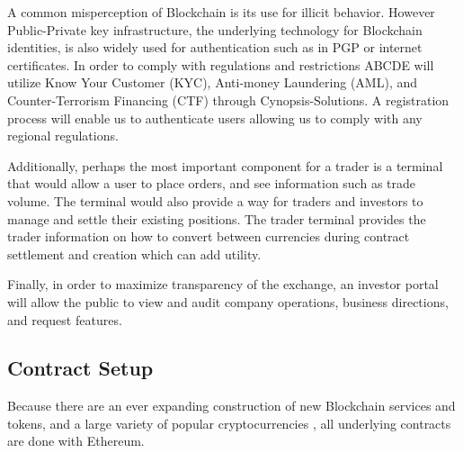 A common misperception of Blockchain is its use for illicit behavior. 
However Public-Private key infrastructure, the underlying technology for Blockchain identities, is also widely used for authentication such as in PGP or internet certificates.
In order to comply with regulations and restrictions ABCDE will utilize Know Your Customer (KYC), Anti-money Laundering (AML), and Counter-Terrorism Financing (CTF) through Cynopsis-Solutions.
A registration process will enable us to authenticate users allowing us to comply with any regional regulations.

Additionally, perhaps the most important component for a trader is a terminal that would allow a user to place orders, and see information such as trade volume.
The terminal would also provide a way for traders and investors to manage and settle their existing positions.
The trader terminal provides the trader information on how to convert between currencies during contract settlement and creation which can add utility.


Finally, in order to maximize transparency of the exchange, an investor portal will allow the public to view and audit company operations, business directions, and request features.


\subsection{Contract Setup}
Because there are an ever expanding construction of new Blockchain services and tokens, and a large variety of popular cryptocurrencies%
, all underlying contracts are done with Ethereum. %

